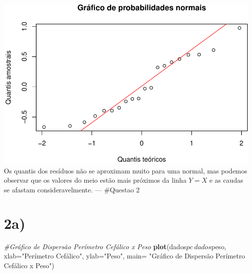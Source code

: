 \documentclass[11pt,]{article}
\makeatletter
\newenvironment{Shaded}{\begin{snugshade}}{\end{snugshade}}
\newcommand{\KeywordTok}[1]{\textcolor[rgb]{0.13,0.29,0.53}{\textbf{{#1}}}}
\newcommand{\DataTypeTok}[1]{\textcolor[rgb]{0.13,0.29,0.53}{{#1}}}
\newcommand{\StringTok}[1]{\textcolor[rgb]{0.31,0.60,0.02}{{#1}}}
\newcommand{\CommentTok}[1]{\textcolor[rgb]{0.56,0.35,0.01}{\textit{{#1}}}}
\newcommand{\NormalTok}[1]{{#1}}
\def\maxwidth{\ifdim\Gin@nat@width>\linewidth\linewidth
\else\Gin@nat@width\fi}
\let\Oldincludegraphics\includegraphics
\renewcommand{\includegraphics}[1]{\Oldincludegraphics[width=\maxwidth]{#1}}
\makeatother
\begin{document}
\includegraphics{versaofinal_lista3_files/figure-latex/unnamed-chunk-7-1.pdf}
Os quantis dos resíduos não se aproximam muito para uma normal, mas
podemos observar que os valores do meio estão mais próximos da linha
\(Y=X\) e as caudas se afastam consideravelmente. --- \#Questao 2

\section{2a)}\label{a-1}

\begin{Shaded}
\end{Shaded}

\begin{Shaded}
\begin{Highlighting}[]
\CommentTok{#Gráfico de Dispersão Perímetro Cefálico x Peso}
\KeywordTok{plot}\NormalTok{(dados$pc~dados$peso, }\DataTypeTok{xlab=}\StringTok{"Perímetro Cefálico"}\NormalTok{, }\DataTypeTok{ylab=}\StringTok{"Peso"}\NormalTok{,}
     \DataTypeTok{main=} \StringTok{"Gráfico de Dispersão Perímetro Cefálico x Peso"}\NormalTok{)}
\end{Highlighting}
\end{Shaded}
\end{document}
